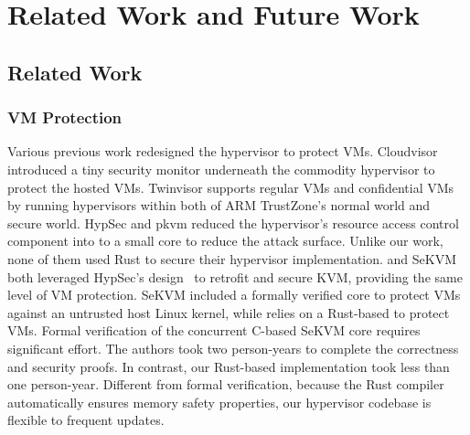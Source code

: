 \chapter{Related Work and Future Work}
\label{sec:rwfw}

\section{Related Work}

\subsection{VM Protection}
Various previous work redesigned the hypervisor to protect VMs.
Cloudvisor \cite{zhang2011cloudvisor, zeyu20usenix} introduced a tiny security
monitor underneath the commodity hypervisor to protect the hosted VMs.
Twinvisor \cite{lisosp21} supports regular VMs and confidential VMs by running
hypervisors within both of ARM TrustZone's normal world and secure world.
HypSec and pkvm \cite{hypsec, pkvm} reduced the hypervisor's resource access
control component into to a small core to reduce the attack surface.
Unlike our work, none of them used Rust to secure their hypervisor
implementation.
\rustsec{} and SeKVM~\cite{sekvm} both leveraged HypSec's design~\cite{hypsec}
to retrofit and secure KVM, providing the same level of VM protection. SeKVM
included a formally verified core to protect VMs against an untrusted host Linux
kernel, while \rustsec{} relies on a Rust-based \rustcore{} to protect VMs.
Formal verification of the concurrent C-based SeKVM core requires significant
effort. The authors took two person-years to complete the correctness and
security proofs.
In contrast, our Rust-based implementation took less than one person-year.
Different from formal verification, because the Rust compiler automatically
ensures memory safety properties, our hypervisor codebase is flexible to
frequent updates.

